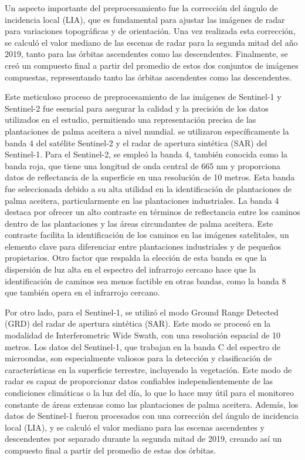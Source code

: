 Un aspecto importante del preprocesamiento fue la corrección del ángulo de incidencia local (LIA), que es fundamental para ajustar las imágenes de radar para variaciones topográficas y de orientación. Una vez realizada esta corrección, se calculó el valor mediano de las escenas de radar para la segunda mitad del año 2019, tanto para las órbitas ascendentes como las descendentes. Finalmente, se creó un compuesto final a partir del promedio de estos dos conjuntos de imágenes compuestas, representando tanto las órbitas ascendentes como las descendentes.

Este meticuloso proceso de preprocesamiento de las imágenes de Sentinel-1 y Sentinel-2 fue esencial para asegurar la calidad y la precisión de los datos utilizados en el estudio, permitiendo una representación precisa de las plantaciones de palma aceitera a nivel mundial. se utilizaron específicamente la banda 4 del satélite Sentinel-2 y el radar de apertura sintética (SAR) del Sentinel-1. Para el Sentinel-2, se empleó la banda 4, también conocida como la banda roja, que tiene una longitud de onda central de 665 nm y proporciona datos de reflectancia de la superficie en una resolución de 10 metros. Esta banda fue seleccionada debido a su alta utilidad en la identificación de plantaciones de palma aceitera, particularmente en las plantaciones industriales. La banda 4 destaca por ofrecer un alto contraste en términos de reflectancia entre los caminos dentro de las plantaciones y las áreas circundantes de palma aceitera. Este contraste facilita la identificación de los caminos en las imágenes satelitales, un elemento clave para diferenciar entre plantaciones industriales y de pequeños propietarios. Otro factor que respalda la elección de esta banda es que la dispersión de luz alta en el espectro del infrarrojo cercano hace que la identificación de caminos sea menos factible en otras bandas, como la banda 8 que también opera en el infrarrojo cercano.

Por otro lado, para el Sentinel-1, se utilizó el modo Ground Range Detected (GRD) del radar de apertura sintética (SAR). Este modo se procesó en la modalidad de Interferometric Wide Swath, con una resolución espacial de 10 metros. Los datos del Sentinel-1, que trabajan en la banda C del espectro de microondas, son especialmente valiosos para la detección y clasificación de características en la superficie terrestre, incluyendo la vegetación. Este modo de radar es capaz de proporcionar datos confiables independientemente de las condiciones climáticas o la luz del día, lo que lo hace muy útil para el monitoreo constante de áreas extensas como las plantaciones de palma aceitera.  Además, los datos de Sentinel-1 fueron procesados con una corrección del ángulo de incidencia local (LIA), y se calculó el valor mediano para las escenas ascendentes y descendentes por separado durante la segunda mitad de 2019, creando así un compuesto final a partir del promedio de estas dos órbitas.

